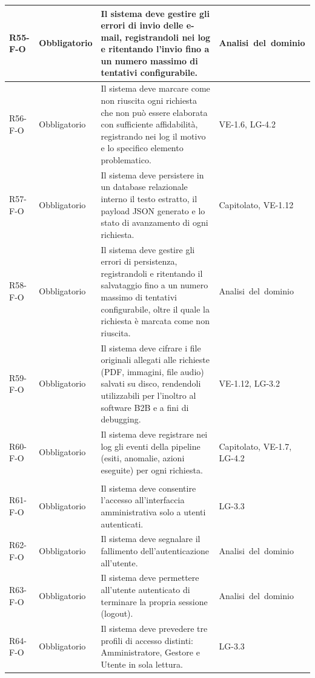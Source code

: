 {\begin{longtable}{|>{\raggedright\arraybackslash}p{1.8cm}|>{\raggedright\arraybackslash}p{2.3cm}|>{\raggedright\arraybackslash}p{6.6cm}|>{\raggedright\arraybackslash}p{3.1cm}|}
    \mbox{R55-F-O} & Obbligatorio & Il sistema deve gestire gli errori di invio delle e-mail, registrandoli nei log e ritentando l'invio fino a un numero massimo di tentativi configurabile. & \mbox{Analisi del dominio} \\ \hline
    \mbox{R56-F-O} & Obbligatorio & Il sistema deve marcare come non riuscita ogni richiesta che non può essere elaborata con sufficiente affidabilità, registrando nei log il motivo e lo specifico elemento problematico. & \mbox{VE-1.6}, \mbox{LG-4.2} \\ \hline
    \mbox{R57-F-O} & Obbligatorio & Il sistema deve persistere in un database relazionale interno il testo estratto, il payload JSON generato e lo stato di avanzamento di ogni richiesta. & \mbox{Capitolato}, \mbox{VE-1.12} \\ \hline
    \mbox{R58-F-O} & Obbligatorio & Il sistema deve gestire gli errori di persistenza, registrandoli e ritentando il salvataggio fino a un numero massimo di tentativi configurabile, oltre il quale la richiesta è marcata come non riuscita. & \mbox{Analisi del dominio} \\ \hline
    \mbox{R59-F-O} & Obbligatorio & Il sistema deve cifrare i file originali allegati alle richieste (PDF, immagini, file audio) salvati su disco, rendendoli utilizzabili per l'inoltro al software B2B e a fini di debugging. & \mbox{VE-1.12}, \mbox{LG-3.2} \\ \hline
    \mbox{R60-F-O} & Obbligatorio & Il sistema deve registrare nei log gli eventi della pipeline (esiti, anomalie, azioni eseguite) per ogni richiesta. & \mbox{Capitolato}, \mbox{VE-1.7}, \mbox{LG-4.2} \\ \hline
    \multicolumn{4}{|l|}{\cellcolor[gray]{0.94}\textbf{Macroarea 6 --- Interfaccia amministrativa e profili di accesso}} \\ \hline
    \mbox{R61-F-O} & Obbligatorio & Il sistema deve consentire l'accesso all'interfaccia amministrativa solo a utenti autenticati. & \mbox{LG-3.3} \\ \hline
    \mbox{R62-F-O} & Obbligatorio & Il sistema deve segnalare il fallimento dell'autenticazione all'utente. & \mbox{Analisi del dominio} \\ \hline
    \mbox{R63-F-O} & Obbligatorio & Il sistema deve permettere all'utente autenticato di terminare la propria sessione (logout). & \mbox{Analisi del dominio} \\ \hline
    \mbox{R64-F-O} & Obbligatorio & Il sistema deve prevedere tre profili di accesso distinti: Amministratore, Gestore e Utente in sola lettura. & \mbox{LG-3.3} \\ \hline

\end{longtable}}

